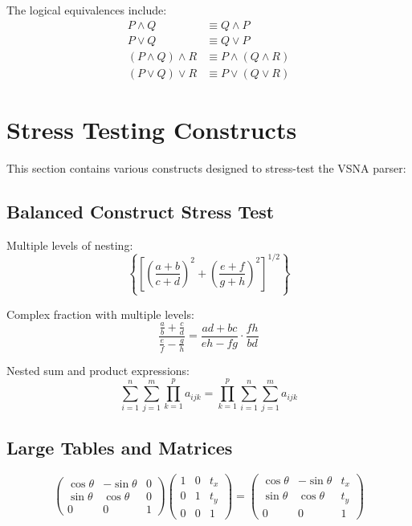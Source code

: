 \documentclass[12pt]{article}
\begin{document}
The logical equivalences include:
\begin{align}
P \land Q &\equiv Q \land P \\
P \lor Q &\equiv Q \lor P \\
(P \land Q) \land R &\equiv P \land (Q \land R) \\
(P \lor Q) \lor R &\equiv P \lor (Q \lor R)
\end{align}

\section{Stress Testing Constructs}

This section contains various constructs designed to stress-test the VSNA parser:

\subsection{Balanced Construct Stress Test}

Multiple levels of nesting:
\begin{equation}
\left\{\left[\left(\frac{a+b}{c+d}\right)^2 + \left(\frac{e+f}{g+h}\right)^2\right]^{1/2}\right\}
\end{equation}

Complex fraction with multiple levels:
\begin{equation}
\frac{\frac{a}{b} + \frac{c}{d}}{\frac{e}{f} - \frac{g}{h}} = \frac{ad + bc}{eh - fg} \cdot \frac{fh}{bd}
\end{equation}

Nested sum and product expressions:
\begin{equation}
\sum_{i=1}^{n} \sum_{j=1}^{m} \prod_{k=1}^{p} a_{ijk} = \prod_{k=1}^{p} \sum_{i=1}^{n} \sum_{j=1}^{m} a_{ijk}
\end{equation}

\subsection{Large Tables and Matrices}

\begin{equation}
\begin{pmatrix}
\cos\theta & -\sin\theta & 0 \\
\sin\theta & \cos\theta & 0 \\
0 & 0 & 1
\end{pmatrix}
\begin{pmatrix}
1 & 0 & t_x \\
0 & 1 & t_y \\
0 & 0 & 1
\end{pmatrix}
=
\begin{pmatrix}
\cos\theta & -\sin\theta & t_x \\
\sin\theta & \cos\theta & t_y \\
0 & 0 & 1
\end{pmatrix}
\end{equation}
\end{document}
